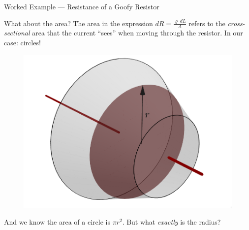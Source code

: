 \documentclass{beamer}
\begin{document}
\begin{frame}{Worked Example --- Resistance of a Goofy Resistor}

What about the area? The area in the expression $dR = \frac{\varrho\ dL}{A}$ refers to the \emph{cross-sectional} area that the current ``sees'' when moving through the resistor. In our case: circles!

\begin{figure}[H]
\centering
\includegraphics[height=0.5\textheight]{figures/lampcirc.png}
\end{figure}

And we know the area of a circle is $\pi r^2$. But what \emph{exactly} is the radius?

\end{frame}
\end{document}

